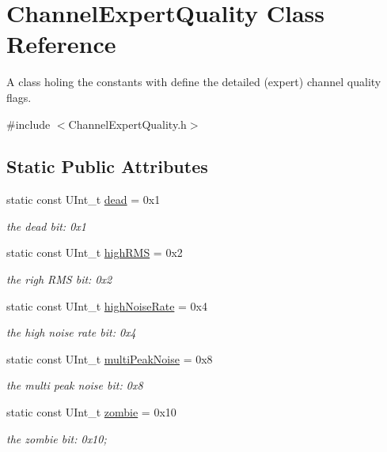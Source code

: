 \hypertarget{class_channel_expert_quality}{
\section{ChannelExpertQuality Class Reference}
\label{class_channel_expert_quality}
}


A class holing the constants with define the detailed (expert) channel quality flags.  


{\ttfamily \#include $<$ChannelExpertQuality.h$>$}\subsection*{Static Public Attributes}
\begin{DoxyCompactItemize}
\item 
static const UInt\_\-t \hyperlink{class_channel_expert_quality_aabde82530d3975d698fbff3e33d7972c}{dead} = 0x1
\begin{DoxyCompactList}\small\item\em the dead bit: 0x1 \item\end{DoxyCompactList}\item 
static const UInt\_\-t \hyperlink{class_channel_expert_quality_a0b17164b19cdc8619c1a93fe1728c4c3}{highRMS} = 0x2
\begin{DoxyCompactList}\small\item\em the righ RMS bit: 0x2 \item\end{DoxyCompactList}\item 
static const UInt\_\-t \hyperlink{class_channel_expert_quality_a7ec5758ee03b6f11af837adad6b4a676}{highNoiseRate} = 0x4
\begin{DoxyCompactList}\small\item\em the high noise rate bit: 0x4 \item\end{DoxyCompactList}\item 
static const UInt\_\-t \hyperlink{class_channel_expert_quality_a13046f6e61373f907a79326530ee2e07}{multiPeakNoise} = 0x8
\begin{DoxyCompactList}\small\item\em the multi peak noise bit: 0x8 \item\end{DoxyCompactList}\item 
static const UInt\_\-t \hyperlink{class_channel_expert_quality_a260970cb0e2fe88bfc6cf741ca95b104}{zombie} = 0x10
\begin{DoxyCompactList}\small\item\em the zombie bit: 0x10; \item\end{DoxyCompactList}\end{DoxyCompactItemize}


